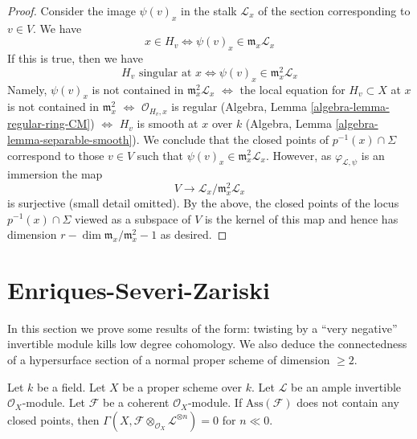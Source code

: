 \begin{proof}
\medskip\noindent
Consider the image $\psi(v)_x$ in the stalk $\mathcal{L}_x$
of the section corresponding to $v \in V$. We have
$$
x \in H_v \Leftrightarrow \psi(v)_x \in \mathfrak m_x\mathcal{L}_x
$$
If this is true, then we have
$$
H_v\text{ singular at }x \Leftrightarrow
\psi(v)_x \in \mathfrak m_x^2\mathcal{L}_x
$$
Namely, $\psi(v)_x$ is not contained in $\mathfrak m_x^2\mathcal{L}_x$
$\Leftrightarrow$
the local equation for $H_v \subset X$ at $x$ is not contained
in $\mathfrak m_x^2$
$\Leftrightarrow$
$\mathcal{O}_{H_v, x}$ is regular
(Algebra, Lemma \ref{algebra-lemma-regular-ring-CM})
$\Leftrightarrow$
$H_v$ is smooth at $x$ over $k$
(Algebra, Lemma \ref{algebra-lemma-separable-smooth}).
We conclude that the closed points of $p^{-1}(x) \cap \Sigma$ correspond
to those $v \in V$ such that $\psi(v)_x \in \mathfrak m_x^2\mathcal{L}_x$.
However, as $\varphi_{\mathcal{L}, \psi}$ is an immersion the
map
$$
V \longrightarrow \mathcal{L}_x/\mathfrak m_x^2\mathcal{L}_x
$$
is surjective (small detail omitted). By the above, the closed points
of the locus $p^{-1}(x) \cap \Sigma$ viewed as a subspace of $V$
is the kernel of this map and hence has dimension
$r - \dim \mathfrak m_x/\mathfrak m_x^2 - 1$ as desired.
\end{proof}






\section{Enriques-Severi-Zariski}
\label{section-vanishing-negative}

\noindent
In this section we prove some results of the form: twisting by
a ``very negative'' invertible module kills low
degree cohomology. We also deduce the connectedness
of a hypersurface section of a normal proper scheme of
dimension $\geq 2$.

\begin{lemma}
\label{lemma-vanishin-h0-negative}
Let $k$ be a field. Let $X$ be a proper scheme over $k$. Let $\mathcal{L}$
be an ample invertible $\mathcal{O}_X$-module. Let $\mathcal{F}$ be a
coherent $\mathcal{O}_X$-module. If $\text{Ass}(\mathcal{F})$ does not
contain any closed points, then
$\Gamma(X, \mathcal{F} \otimes_{\mathcal{O}_X} \mathcal{L}^{\otimes n}) = 0$
for $n \ll 0$.
\end{lemma}

